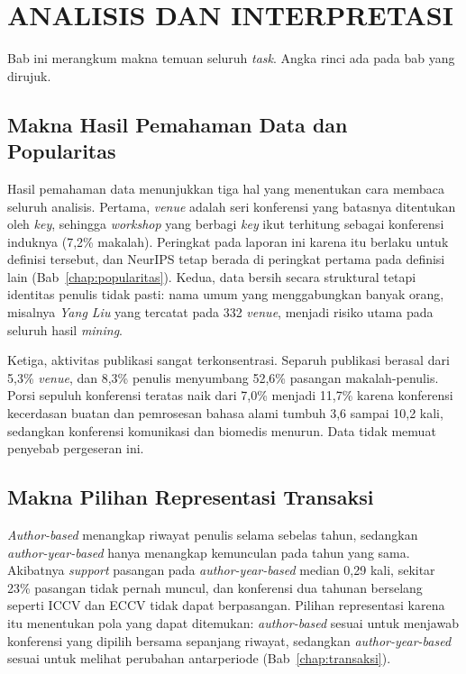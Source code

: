 \chapter{ANALISIS DAN INTERPRETASI}
\label{chap:analisis}

Bab ini merangkum makna temuan seluruh \textit{task}. Angka rinci ada pada bab yang dirujuk.

\section{Makna Hasil Pemahaman Data dan Popularitas}
Hasil pemahaman data menunjukkan tiga hal yang menentukan cara membaca seluruh analisis. Pertama, \textit{venue} adalah seri konferensi yang batasnya ditentukan oleh \textit{key}, sehingga \textit{workshop} yang berbagi \textit{key} ikut terhitung sebagai konferensi induknya (7,2\% makalah). Peringkat pada laporan ini karena itu berlaku untuk definisi tersebut, dan NeurIPS tetap berada di peringkat pertama pada definisi lain (Bab~\ref{chap:popularitas}). Kedua, data bersih secara struktural tetapi identitas penulis tidak pasti: nama umum yang menggabungkan banyak orang, misalnya \textit{Yang Liu} yang tercatat pada 332 \textit{venue}, menjadi risiko utama pada seluruh hasil \textit{mining}.

Ketiga, aktivitas publikasi sangat terkonsentrasi. Separuh publikasi berasal dari 5,3\% \textit{venue}, dan 8,3\% penulis menyumbang 52,6\% pasangan makalah-penulis. Porsi sepuluh konferensi teratas naik dari 7,0\% menjadi 11,7\% karena konferensi kecerdasan buatan dan pemrosesan bahasa alami tumbuh 3,6 sampai 10,2 kali, sedangkan konferensi komunikasi dan biomedis menurun. Data tidak memuat penyebab pergeseran ini.

\section{Makna Pilihan Representasi Transaksi}
\textit{Author-based} menangkap riwayat penulis selama sebelas tahun, sedangkan \textit{author-year-based} hanya menangkap kemunculan pada tahun yang sama. Akibatnya \textit{support} pasangan pada \textit{author-year-based} median 0,29 kali, sekitar 23\% pasangan tidak pernah muncul, dan konferensi dua tahunan berselang seperti ICCV dan ECCV tidak dapat berpasangan. Pilihan representasi karena itu menentukan pola yang dapat ditemukan: \textit{author-based} sesuai untuk menjawab konferensi yang dipilih bersama sepanjang riwayat, sedangkan \textit{author-year-based} sesuai untuk melihat perubahan antarperiode (Bab~\ref{chap:transaksi}).


